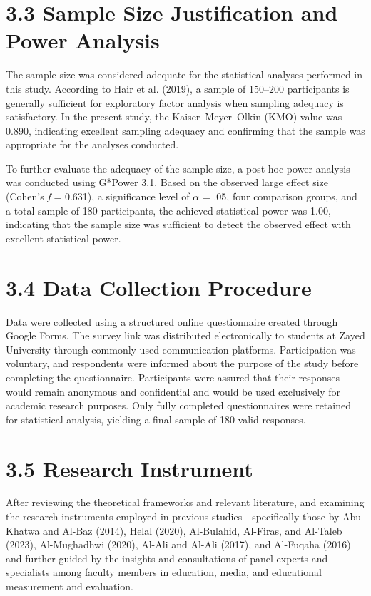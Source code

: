 \documentclass[10pt]{NSP1}
\begin{document}
	\section*{3.3 Sample Size Justification and Power Analysis}
	
	The sample size was considered adequate for the statistical analyses performed in this study. According to Hair et al. (2019), a sample of 150–200 participants is generally sufficient for exploratory factor analysis when sampling adequacy is satisfactory. In the present study, the Kaiser–Meyer–Olkin (KMO) value was 0.890, indicating excellent sampling adequacy and confirming that the sample was appropriate for the analyses conducted.
	
	To further evaluate the adequacy of the sample size, a post hoc power analysis was conducted using G*Power 3.1. Based on the observed large effect size (Cohen's \textit{f} = 0.631), a significance level of $\alpha$ = .05, four comparison groups, and a total sample of 180 participants, the achieved statistical power was 1.00, indicating that the sample size was sufficient to detect the observed effect with excellent statistical power.
	
	\section*{3.4 Data Collection Procedure}
	
	Data were collected using a structured online questionnaire created through Google Forms. The survey link was distributed electronically to students at Zayed University through commonly used communication platforms. Participation was voluntary, and respondents were informed about the purpose of the study before completing the questionnaire. Participants were assured that their responses would remain anonymous and confidential and would be used exclusively for academic research purposes. Only fully completed questionnaires were retained for statistical analysis, yielding a final sample of 180 valid responses.
	
	\section*{3.5 Research Instrument}
	
	After reviewing the theoretical frameworks and relevant literature, and examining the research instruments employed in previous studies—specifically those by Abu-Khatwa and Al-Baz (2014), Helal (2020), Al-Bulahid, Al-Firas, and Al-Taleb (2023), Al-Mughadhwi (2020), Al-Ali and Al-Ali (2017), and Al-Fuqaha (2016) and further guided by the insights and consultations of panel experts and specialists among faculty members in education, media, and educational measurement and evaluation.
	
\end{document}
